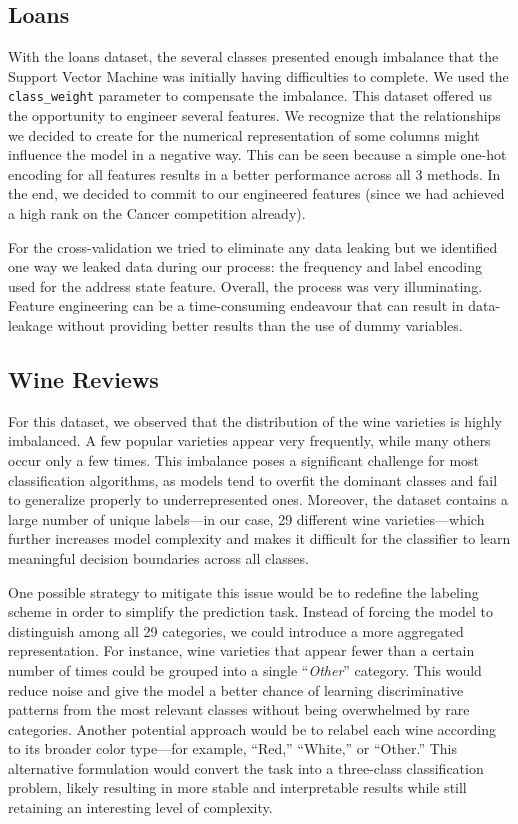 \documentclass[12pt,a4paper]{article}
\begin{document}
\vspace{0.5cm}

\subsection{Loans}
With the loans dataset, the several classes presented enough imbalance that the Support Vector Machine was initially having difficulties to complete. We used the \texttt{class\_weight} parameter to compensate the imbalance. This dataset offered us the opportunity to engineer several features. We recognize that the relationships we decided to create for the numerical representation of some columns might influence the model in a negative way. This can be seen because a simple one-hot encoding for all features results in a better performance across all 3 methods. In the end, we decided to commit to our engineered features (since we had achieved a high rank on the Cancer competition already).

For the cross-validation we tried to eliminate any data leaking but we identified one way we leaked data during our process: the frequency and label encoding used for the address state feature. Overall, the process was very illuminating. Feature engineering can be a time-consuming endeavour that can result in data-leakage without providing better results than the use of dummy variables.

\vspace{0.5cm}

\subsection{Wine Reviews}
For this dataset, we observed that the distribution of the wine varieties is highly imbalanced. A few popular varieties appear very frequently, while many others occur only a few times. This imbalance poses a significant challenge for most classification algorithms, as models tend to overfit the dominant classes and fail to generalize properly to underrepresented ones. Moreover, the dataset contains a large number of unique labels—in our case, 29 different wine varieties—which further increases model complexity and makes it difficult for the classifier to learn meaningful decision boundaries across all classes.

One possible strategy to mitigate this issue would be to redefine the labeling scheme in order to simplify the prediction task. Instead of forcing the model to distinguish among all 29 categories, we could introduce a more aggregated representation. For instance, wine varieties that appear fewer than a certain number of times could be grouped into a single “\textit{Other}” category. This would reduce noise and give the model a better chance of learning discriminative patterns from the most relevant classes without being overwhelmed by rare categories. Another potential approach would be to relabel each wine according to its broader color type—for example, “Red,” “White,” or “Other.” This alternative formulation would convert the task into a three-class classification problem, likely resulting in more stable and interpretable results while still retaining an interesting level of complexity.
\end{document}
